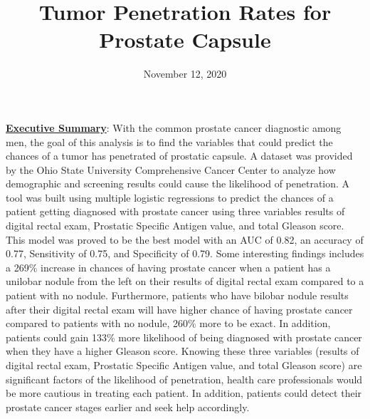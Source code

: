 \documentclass[11pt]{article}\usepackage[]{graphicx}\usepackage[]{color}
\title{Tumor Penetration Rates for Prostate Capsule\vspace{-5ex}}
\date{November 12, 2020\vspace{-5ex}}
\begin{document}
 
\maketitle
\hfill \break


















\noindent\textbf{\underline{Executive Summary}}: With the common prostate cancer diagnostic among men, the goal of this analysis is to find the variables that could predict the chances of a tumor has penetrated of prostatic capsule. A dataset was provided by the Ohio State University Comprehensive Cancer Center to analyze how demographic and screening results could cause the likelihood of penetration. A tool was built using multiple logistic regressions to predict the chances of a patient getting diagnosed with prostate cancer using three variables results of digital rectal exam, Prostatic Specific Antigen value, and total Gleason score. This model was proved to be the best model with an AUC of 0.82, an accuracy of 0.77, Sensitivity of 0.75, and Specificity of 0.79. Some interesting findings includes a 269\% increase in chances of having prostate cancer when a patient has a unilobar nodule from the left on their results of digital rectal exam compared to a patient with no nodule. Furthermore, patients who have bilobar nodule results after their digital rectal exam will have higher chance of having prostate cancer compared to patients with no nodule, 260\% more to be exact. In addition, patients could gain 133\% more likelihood of being diagnosed with prostate cancer when they have a higher Gleason score. Knowing these three variables (results of digital rectal exam, Prostatic Specific Antigen value, and total Gleason score) are significant factors of the likelihood of penetration, health care professionals would be more cautious in treating each patient. In addition, patients could detect their prostate cancer stages earlier and seek help accordingly.      
\hfill \break
\end{document}
